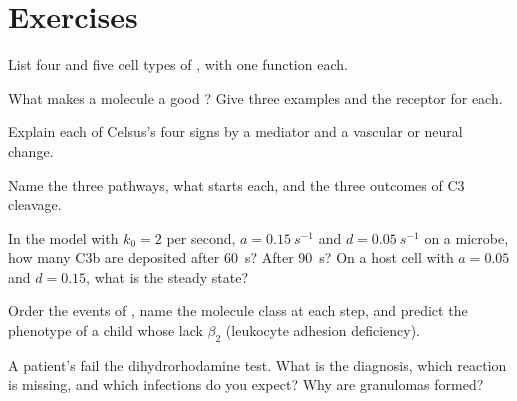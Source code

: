 \section{Exercises}

\begin{exercise}[$\star$]\label{exo:b3:innate-immunity:1}
List four  and five cell types of , with one
function each.
\end{exercise}

\begin{exercise}[$\star$]\label{exo:b3:innate-immunity:2}
What makes a molecule a good ?
Give three examples and the receptor for each.
\end{exercise}

\begin{exercise}[$\star$]\label{exo:b3:innate-immunity:3}
Explain each of Celsus's four signs by a mediator and a vascular or
neural change.
\end{exercise}

\begin{exercise}[$\star$]\label{exo:b3:innate-immunity:4}
Name the three  pathways, what starts each, and the three
outcomes of C3 cleavage.
\end{exercise}

\begin{exercise}[$\star\star$]\label{exo:b3:innate-immunity:5}
In the  model with $k_{0} = 2$ per second, $a =
\qty{0.15}{s^{-1}}$ and $d = \qty{0.05}{s^{-1}}$ on a microbe, how many
C3b are deposited after \qty{60}{s}? After \qty{90}{s}? On a host cell
with $a = 0.05$ and $d = 0.15$, what is the steady state?
\end{exercise}

\begin{exercise}[$\star\star$]\label{exo:b3:innate-immunity:6}
Order the events of , name the molecule class at each
step, and predict the phenotype of a child whose  lack
$\beta_{2}$  (leukocyte adhesion deficiency).
\end{exercise}

\begin{exercise}[$\star\star$]\label{exo:b3:innate-immunity:7}
A patient's  fail the dihydrorhodamine test. What is the
diagnosis, which reaction is missing, and which infections do you
expect? Why are granulomas formed?
\end{exercise}

